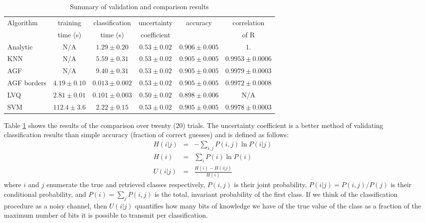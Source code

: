 \begin{table}
  \begin{center}
  \caption{Summary of validation and comparison results}
     \begin{tabular}{|l|c|c|c|c|c|} \hline
       Algorithm &     training &  classification & uncertainty &      accuracy &   correlation \\
                 &     time (s) &  time (s)       & coefficient &               & of R \\ \hline\hline
        Analytic &     N/A &  $1.29 \pm 0.20$ & $0.53 \pm 0.02$ & $0.906 \pm 0.005$ & $1.$ \\ \hline
             KNN &     N/A &  $5.59 \pm 0.31$ & $0.53 \pm 0.02$ & $0.905 \pm 0.005$ & $0.9953 \pm 0.0006$\\ \hline
             AGF &     N/A &  $9.40 \pm 0.31$ & $0.53 \pm 0.02$ & $0.905 \pm 0.005$ & $0.9979 \pm 0.0003$\\ \hline
     AGF borders & $4.19\pm0.10$ & $0.013\pm0.002$ & $0.53\pm0.02$ & $0.905\pm0.005$ & $0.9972 \pm 0.0008$\\ \hline
             LVQ & $2.81\pm0.01$ & $0.101\pm0.003$ & $0.50\pm0.02$ & $0.898\pm0.006$ &  N/A \\ \hline
             SVM & $112.4\pm3.6$ & $2.22\pm0.15$ & $0.53\pm0.02$ & $0.905\pm0.005$ & $0.9978\pm 0.0003$ \\ \hline
    \end{tabular}
    \label{comp_table}
  \end{center}
\end{table}

Table \ref{comp_table} shows the results of the comparison over twenty (20)
trials.  The uncertainty
coefficient is a better method of validating classification results
than simple accuracy (fraction of correct guesses) and is defined as follows:
\begin{eqnarray}
  H(i|j) & = & - \sum_{i, j} P(i, j) \ln P(i|j)\\
  H(i) & = & \sum_i P(i) \ln P(i) \\
  U(i|j) & = & \frac{H(i)-H(i|j)}{H(i)}
\end{eqnarray}
where $i$ and $j$ enumerate the true and retrieved classes respectively, 
$P(i, j)$ is their joint probability, $P(i|j) = P(i, j)/P(j)$ is their
conditional probability, and $P(i) = \sum_j P(i, j)$ is the total,
invariant probability of the first class.  If we think of the classification
procedure as a noisy channel, then $U(i|j)$ quantifies how many bits of knowledge
we have of the true value of the class as a fraction of the maximum
number of bits it is possible to transmit per classification.
\cite{nr_inc2} \cite{Shannon}

